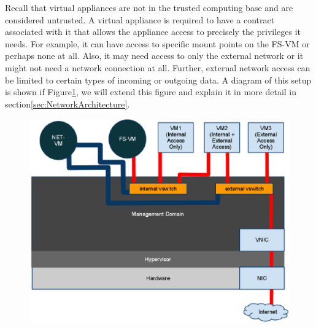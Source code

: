 Recall that virtual appliances are not in the trusted computing base and are considered untrusted. A virtual appliance is required to have a contract associated with it that allows the appliance access to precisely the privileges it needs. For example, it can have access to specific mount points on the FS-VM or perhaps none at all. Also, it may need access to only the external network or it might not need a network connection at all. Further, external network access can be limited to certain types of incoming or outgoing data. A diagram of this setup is shown if Figure\ref{fig:NetworkArchitectureSimplified}, we will extend this figure and explain it in more detail in section\ref{sec:NetworkArchitecture}.

\begin{figure}[tbp]
\begin{centering}
\label{fig:NetworkArchitectureSimplified}
\includegraphics[scale=0.9,angle=90]{figs/NetworkArchitectureSimplified}
\end{centering} 
\end{figure}


